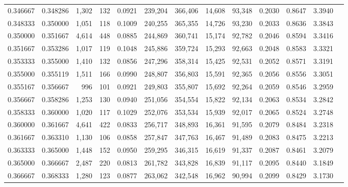 \begin{tabular}{rrrrrrrrrrrrr}
0.346667 & 0.348286 & 1,302 & 132 &                                     0.0921 & 239,204 & 366,406 &  14,608 &  93,348 & 0.2030 & 0.8647 & 3.3940 \\
0.348333 & 0.350000 & 1,051 & 118 &                                     0.1009 & 240,255 & 365,355 &  14,726 &  93,230 & 0.2033 & 0.8636 & 3.3843 \\
0.350000 & 0.351667 & 4,614 & 448 &                                     0.0885 & 244,869 & 360,741 &  15,174 &  92,782 & 0.2046 & 0.8594 & 3.3416 \\
0.351667 & 0.353286 & 1,017 & 119 &                                     0.1048 & 245,886 & 359,724 &  15,293 &  92,663 & 0.2048 & 0.8583 & 3.3321 \\
0.353333 & 0.355000 & 1,410 & 132 &                                     0.0856 & 247,296 & 358,314 &  15,425 &  92,531 & 0.2052 & 0.8571 & 3.3191 \\
0.355000 & 0.355119 & 1,511 & 166 &                                     0.0990 & 248,807 & 356,803 &  15,591 &  92,365 & 0.2056 & 0.8556 & 3.3051 \\
0.355167 & 0.356667 &   996 & 101 &                                     0.0921 & 249,803 & 355,807 &  15,692 &  92,264 & 0.2059 & 0.8546 & 3.2959 \\
0.356667 & 0.358286 & 1,253 & 130 &                                     0.0940 & 251,056 & 354,554 &  15,822 &  92,134 & 0.2063 & 0.8534 & 3.2842 \\
0.358333 & 0.360000 & 1,020 & 117 &                                     0.1029 & 252,076 & 353,534 &  15,939 &  92,017 & 0.2065 & 0.8524 & 3.2748 \\
0.360000 & 0.361667 & 4,641 & 422 &                                     0.0833 & 256,717 & 348,893 &  16,361 &  91,595 & 0.2079 & 0.8484 & 3.2318 \\
0.361667 & 0.363310 & 1,130 & 106 &                                     0.0858 & 257,847 & 347,763 &  16,467 &  91,489 & 0.2083 & 0.8475 & 3.2213 \\
0.363333 & 0.365000 & 1,448 & 152 &                                     0.0950 & 259,295 & 346,315 &  16,619 &  91,337 & 0.2087 & 0.8461 & 3.2079 \\
0.365000 & 0.366667 & 2,487 & 220 &                                     0.0813 & 261,782 & 343,828 &  16,839 &  91,117 & 0.2095 & 0.8440 & 3.1849 \\
0.366667 & 0.368333 & 1,280 & 123 &                                     0.0877 & 263,062 & 342,548 &  16,962 &  90,994 & 0.2099 & 0.8429 & 3.1730 \\

\end{tabular}
